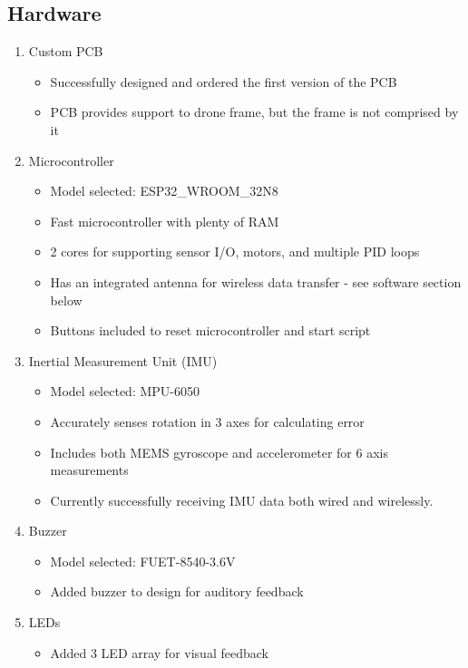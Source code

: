 \documentclass[12pt, titlepage]{article}
\begin{document}
\subsection{Hardware}
\begin{enumerate}

\item Custom PCB
\begin{itemize}
\item Successfully designed and ordered the first version of the PCB
\item PCB provides support to drone frame, but the frame is not comprised by it
\end{itemize}

\item Microcontroller
\begin{itemize}
\item Model selected: ESP32\_WROOM\_32N8 
\item Fast microcontroller with plenty of RAM
\item 2 cores for supporting sensor I/O, motors, and multiple PID loops
\item Has an integrated antenna for wireless data transfer - see software section below
\item Buttons included to reset microcontroller and start script
\end{itemize}

\item Inertial Measurement Unit (IMU)
\begin{itemize}
\item Model selected: MPU-6050
\item Accurately senses rotation in 3 axes for calculating error
\item Includes both MEMS gyroscope and accelerometer for 6 axis measurements
\item Currently successfully receiving IMU data both wired and wirelessly.
\end{itemize}

\item Buzzer
\begin{itemize}
\item Model selected: FUET-8540-3.6V
\item Added buzzer to design for auditory feedback
\end{itemize}

\item LEDs
\begin{itemize}
\item Added 3 LED array for visual feedback
\end{itemize}


\end{enumerate}
\end{document}
